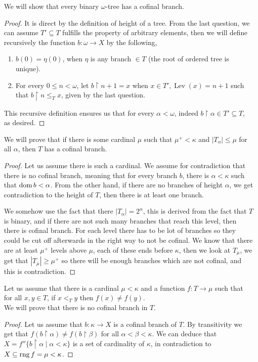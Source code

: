 \question{}
We will show that every binary $\omega$-tree has a cofinal branch.
\begin{proof}
	It is direct by the definition of height of a tree.
	From the last question, we can assume $T' \subseteq T$ fulfills the property of arbitrary elements, then we will define recursively the function $b : \omega \to X$ by the following,
	\begin{enumerate}
		\item $b(0) = \eta(0)$, when $\eta$ is any branch $\in T$ (the root of ordered tree is unique).
		\item For every $0 \le n < \omega$, let $b \restriction n + 1 = x$ when $x \in T', \operatorname{Lev}(x) = n + 1$ such that $b \restriction n \le_T x$, given by the last question.
	\end{enumerate}
	This recursive definition ensures us that for every $\alpha < \omega$, indeed $b \restriction \alpha \in T' \subseteq T$, as desired.
\end{proof}

\question{}
We will prove that if there is some cardinal $\mu$ such that $\mu^+ < \kappa$ and $|T_\alpha| \le \mu$ for all $\alpha$, then $T$ has a cofinal branch.
\begin{proof}
	Let us assume there is such a cardinal.
	We assume for contradiction that there is no cofinal branch, meaning that for every branch $b$, there is $\alpha < \kappa$ such that $\operatorname{dom} b < \alpha$.
	From the other hand, if there are no branches of height $\alpha$, we get contradiction to the height of $T$, then there is at least one branch.

	We somehow use the fact that there $|T_\alpha| = 2^\alpha$, this is derived from the fact that $T$ is binary, and if there are not such many branches that reach this level, then there is cofinal branch.
	For each level there has to be lot of branches so they could be cut off afterwards in the right way to not be cofinal.
	We know that there are at least $\mu^+$ levels above $\mu$, each of these ends before $\kappa$, then we look at $T_\mu$,
	we get that $|T_\mu| \ge \mu^+$ so there will be enough branches which are not cofinal, and this is contradiction.
\end{proof}

\question{}
Let us assume that there is a cardinal $\mu < \kappa$ and a function $f : T \to \mu$ such that for all $x, y \in T$, if $x <_T y$ then $f(x) \ne f(y)$. \\
We will prove that there is no cofinal branch in $T$.
\begin{proof}
	Let us assume that $b : \kappa \to X$ is a cofinal branch of $T$.
	By transitivity we get that $f(b \restriction \alpha) \ne f(b \restriction \beta)$ for all $\alpha < \beta < \kappa$.
	We can deduce that $X = f '' \{ b \restriction \alpha \mid \alpha < \kappa \}$ is a set of cardinality of $\kappa$, in contradiction to $X \subseteq \operatorname{rng} f = \mu < \kappa$.
\end{proof}

